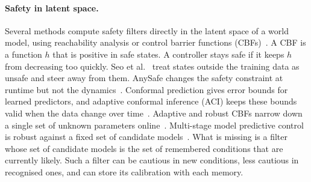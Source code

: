 \documentclass[10pt]{article}
\begin{document}
\paragraph{Safety in latent space.}
Several methods compute safety filters directly in the latent space of a world model, using
reachability analysis or control barrier functions
(CBFs)~\cite{nakamura2025latent,nakamura2026latentcbf,anand2025safety,lutkus2025latent,wu2026points}.
A CBF is a function $h$ that is positive in safe states. A controller stays safe if it keeps $h$ from
decreasing too quickly. Seo et al.~\cite{seo2025uncertainty} treat states outside the training data as
unsafe and steer away from them. AnySafe changes the safety constraint at runtime but not the
dynamics~\cite{agrawal2025anysafe}. Conformal prediction gives error bounds for learned predictors,
and adaptive conformal inference (ACI) keeps these bounds valid when the data change over
time~\cite{gibbs2021adaptive,lindemann2023safe,dixit2023adaptive,huriot2026safe,nath2026pixels,srinivasan2026safety}.
Adaptive and robust CBFs narrow down a single set of unknown parameters
online~\cite{taylor2020adaptive,lopez2021robust,taylor2020learning,castaneda2025recursively}.
Multi-stage model predictive control is robust against a fixed set of candidate
models~\cite{lucia2013multistage}. What is missing is a filter whose set of candidate models is the
set of remembered conditions that are currently likely. Such a filter can be cautious in new
conditions, less cautious in recognised ones, and can store its calibration with each memory.
\end{document}

